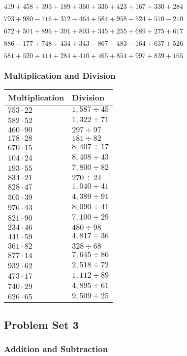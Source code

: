 \(419 + 458 + 393 + 189 + 360 + 336 + 423 + 167 + 330 + 284\)

\(793 + 980 - 716 + 372 - 464 + 584 + 958 - 524 + 570 - 210\)

\(672 + 501 + 896 + 391 + 803 + 345 + 255 + 689 + 275 + 617\)

\(886 - 177 + 748 + 434 + 343 - 867 - 483 - 164 + 637 + 526\)

\(581 + 520 + 414 + 284 + 410 + 465 + 854 + 997 + 839 + 165\)

\hypertarget{multiplication-and-division-102}{%
\subsubsection{Multiplication and
Division}\label{multiplication-and-division-102}}

\begin{longtable}[]{@{}ll@{}}
\toprule
Multiplication & Division\tabularnewline
\midrule
\endhead
\(753 \cdot 22\) & \(1,587÷45\)\tabularnewline
\(582 \cdot 52\) & \(1,322÷71\)\tabularnewline
\(460 \cdot 90\) & \(297÷97\)\tabularnewline
\(178 \cdot 28\) & \(181÷82\)\tabularnewline
\(670 \cdot 15\) & \(8,407÷17\)\tabularnewline
\(104 \cdot 24\) & \(8,408÷43\)\tabularnewline
\(193 \cdot 55\) & \(7,800÷82\)\tabularnewline
\(834 \cdot 21\) & \(270÷24\)\tabularnewline
\(828 \cdot 47\) & \(1,040÷41\)\tabularnewline
\(505 \cdot 39\) & \(4,389÷91\)\tabularnewline
\(976 \cdot 43\) & \(8,090÷41\)\tabularnewline
\(821 \cdot 90\) & \(7,100÷29\)\tabularnewline
\(234 \cdot 46\) & \(480÷98\)\tabularnewline
\(441 \cdot 59\) & \(4,817÷36\)\tabularnewline
\(361 \cdot 82\) & \(328÷68\)\tabularnewline
\(877 \cdot 14\) & \(7,645÷86\)\tabularnewline
\(932 \cdot 62\) & \(2,518÷72\)\tabularnewline
\(473 \cdot 17\) & \(1,112÷89\)\tabularnewline
\(740 \cdot 29\) & \(4,895÷61\)\tabularnewline
\(626 \cdot 65\) & \(9,509÷25\)\tabularnewline
\bottomrule
\end{longtable}

\hypertarget{problem-set-3-2}{%
\subsection{Problem Set 3}\label{problem-set-3-2}}

\hypertarget{addition-and-subtraction-103}{%
\subsubsection{Addition and
Subtraction}\label{addition-and-subtraction-103}}

